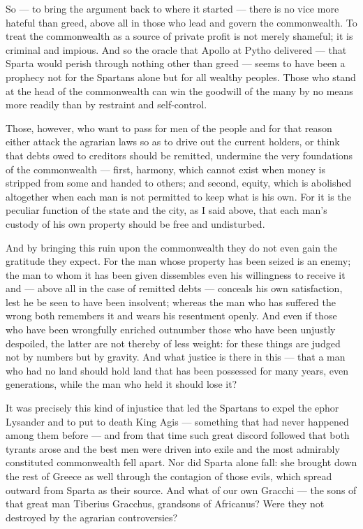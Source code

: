  So — to bring the argument back to where it started — there is no vice more hateful than greed, above all in those who lead and govern the commonwealth. To treat the commonwealth as a source of private profit is not merely shameful; it is criminal and impious. And so the oracle that Apollo at Pytho delivered — that Sparta would perish through nothing other than greed — seems to have been a prophecy not for the Spartans alone but for all wealthy peoples. Those who stand at the head of the commonwealth can win the goodwill of the many by no means more readily than by restraint and self-control.

 Those, however, who want to pass for men of the people and for that reason either attack the agrarian laws so as to drive out the current holders, or think that debts owed to creditors should be remitted, undermine the very foundations of the commonwealth — first, harmony, which cannot exist when money is stripped from some and handed to others; and second, equity, which is abolished altogether when each man is not permitted to keep what is his own. For it is the peculiar function of the state and the city, as I said above, that each man's custody of his own property should be free and undisturbed.

 And by bringing this ruin upon the commonwealth they do not even gain the gratitude they expect. For the man whose property has been seized is an enemy; the man to whom it has been given dissembles even his willingness to receive it and — above all in the case of remitted debts — conceals his own satisfaction, lest he be seen to have been insolvent; whereas the man who has suffered the wrong both remembers it and wears his resentment openly. And even if those who have been wrongfully enriched outnumber those who have been unjustly despoiled, the latter are not thereby of less weight: for these things are judged not by numbers but by gravity. And what justice is there in this — that a man who had no land should hold land that has been possessed for many years, even generations, while the man who held it should lose it?

 It was precisely this kind of injustice that led the Spartans to expel the ephor Lysander and to put to death King Agis — something that had never happened among them before — and from that time such great discord followed that both tyrants arose and the best men were driven into exile and the most admirably constituted commonwealth fell apart. Nor did Sparta alone fall: she brought down the rest of Greece as well through the contagion of those evils, which spread outward from Sparta as their source. And what of our own Gracchi — the sons of that great man Tiberius Gracchus, grandsons of Africanus? Were they not destroyed by the agrarian controversies?

